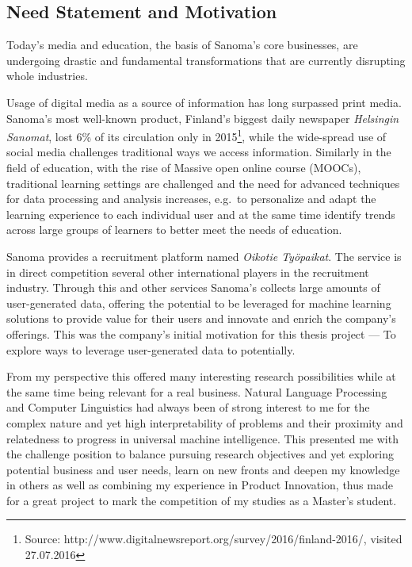 \subsection{Need Statement and Motivation}

Today's media and education, the basis of Sanoma's core businesses, are undergoing drastic and fundamental transformations that are currently disrupting whole industries.

Usage of digital media as a source of information has long surpassed print media. Sanoma's most well-known product, Finland's biggest daily newspaper \emph{Helsingin Sanomat}, lost 6\% of its circulation only in 2015\footnote{Source: http://www.digitalnewsreport.org/survey/2016/finland-2016/, visited 27.07.2016}, while the wide-spread use of social media challenges traditional ways we access information. Similarly in the field of education, with the rise of Massive open online course (MOOCs), traditional learning settings are challenged and the need for advanced techniques for data processing and analysis increases, e.g.\ to personalize and adapt the learning experience to each individual user and at the same time identify trends across large groups of learners to better meet the needs of education.

Sanoma provides a recruitment platform named \emph{Oikotie Työpaikat}. The service is in direct competition several other international players in the recruitment industry. Through this and other services Sanoma's collects large amounts of user-generated data, offering the potential to be leveraged for machine learning solutions to provide value for their users and innovate and enrich the company's offerings.
This was the company's initial motivation for this thesis project --- To explore ways to leverage user-generated data to potentially.

From my perspective this offered many interesting research possibilities while at the same time being relevant for a real business. Natural Language Processing and Computer Linguistics had always been of strong interest to me for the complex nature and yet high interpretability of problems and their proximity and relatedness to progress in universal machine intelligence. This presented me with the challenge position to balance pursuing research objectives and yet exploring potential business and user needs, learn on new fronts and deepen my knowledge in others as well as combining my experience in Product Innovation, thus made for a great project to mark the competition of my studies as a Master's student.

